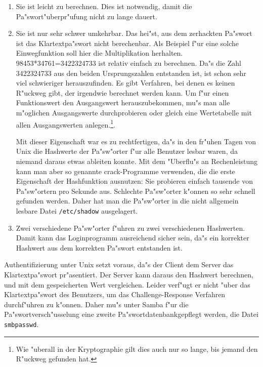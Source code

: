 \documentclass{scrartcl}\usepackage{pslatex}\typearea{12}
\newcommand{\dateistyle}{\texttt}
\begin{document}
\begin{enumerate}

\item Sie ist leicht zu berechnen. Dies ist notwendig, damit die
Pa"swort"uberpr"ufung nicht zu lange dauert.

\item Sie ist nur sehr schwer umkehrbar. Das hei"st, aus dem
  zerhackten Pa"swort ist das Klartextpa"swort nicht berechenbar. Als
  Beispiel f"ur eine solche Einwegfunktion soll hier die
  Multiplikation herhalten. 98453*34761=3422324733 ist relativ einfach
  zu berechnen. Da"s die Zahl 3422324733 aus den beiden
  Ursprungszahlen entstanden ist, ist schon sehr viel schwieriger
  herauszufinden. Es gibt Verfahren, bei denen es keinen R"uckweg gibt, der
irgendwie berechnet werden kann. Um f"ur einen Funktionswert den Ausgangswert
herauszubekommen, mu"s man alle m"oglichen Ausgangswerte durchprobieren oder
gleich eine Wertetabelle mit allen Ausgangswerten anlegen.\footnote{Wie
"uberall in der Kryptographie gilt
    dies auch nur so lange, bis jemand den R"uckweg gefunden hat.}.
  
Mit dieser Eigenschaft war es zu rechtfertigen, da"s in den fr"uhen Tagen von
Unix die Hashwerte der Pa"sw"orter f"ur alle Benutzer lesbar waren, da
niemand daraus etwas ableiten konnte. Mit dem "Uberflu"s an Rechenleistung
kann man aber so genannte crack-Programme verwenden, die die erste
Eigenschaft der Hashfunktion ausnutzen: Sie probieren einfach tausende von
Pa"sw"ortern pro Sekunde aus. Schlechte Pa"sw"orter k"onnen so sehr schnell
gefunden werden. Daher hat man die Pa"sw"orter in die nicht allgemein lesbare
Datei \dateistyle{/etc/shadow} ausgelagert.
  
\item Zwei verschiedene Pa"sw"orter f"uhren zu zwei verschiedenen Hashwerten.
Damit kann das Loginprogramm ausreichend sicher sein, da"s ein korrekter
Hashwert aus dem korrekten Pa"swort entstanden ist.

\end{enumerate}

Authentifizierung unter Unix setzt voraus, da"s der Client dem Server
das Klartextpa"swort pr"asentiert. Der Server kann daraus den Hashwert
berechnen, und mit dem gespeicherten Wert vergleichen. Leider verf"ugt er
nicht "uber das Klartextpa"swort des Benutzers, um das
Challenge-Response Verfahren durchf"uhren zu k"onnen. Daher mu"s unter Samba
f"ur die Pa"swortversch"usselung eine zweite Pa"swortdatenbankgepflegt
werden, die Datei \dateistyle{smbpasswd}.
\end{document}
